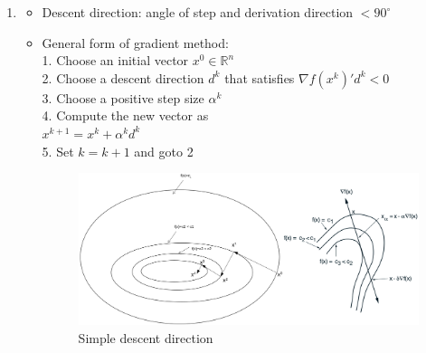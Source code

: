 \documentclass{report}
\begin{document}
\begin{enumerate}
\item 
\begin{itemize}
\item Descent direction: angle of step and derivation direction $< 90^\circ$
\item General form of gradient method: \\
1. Choose an initial vector $x ^0 \in \mathbb{R}^n$\\
2. Choose a descent direction $d^k$ that satisfies $\nabla f (x^k)'  d^k < 0$\\
3. Choose a positive step size $\alpha^k$\\
4. Compute the new vector as\\
$x^{k+1} = x^k + \alpha^k d^k$\\
5. Set $k = k + 1$ and goto 2
\begin{figure}[H]
\includegraphics[width=\textwidth]{desc_dir.png}
\caption{Simple descent direction\label{fig:desc_dir}}
\end{figure}
\end{itemize}


\end{enumerate}
\end{document}
